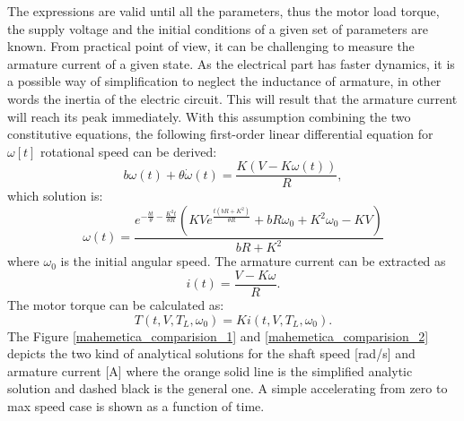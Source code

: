 \documentclass[12pt,english]{article}
\begin{document}
	 
The expressions are valid until all the parameters, thus the motor load torque, the supply voltage and the initial conditions of a given set of parameters are known. From practical point of view, it can be challenging to measure the armature current of a given state. As the electrical part has faster dynamics, it is a possible way of simplification to neglect the inductance of armature, in other words the inertia of the electric circuit. This will result that the armature current will reach its peak immediately.  With this assumption combining the two constitutive equations, the following first-order linear differential equation for $\omega[t]$ rotational speed can be derived:
\begin{equation}
	b \omega(t)+\theta \dot \omega(t)=\frac{K (V-K \omega(t))}{R},
\end{equation} 
which solution is:
\begin{equation}
	\omega(t) = \frac{e^{-\frac{b t}{\theta }-\frac{K^2 t}{\theta  R}} \left(K V e^{\frac{t \left(b R+K^2\right)}{\theta  R}}+b R \text{$\omega_0 $}+K^2 \text{$\omega_0 $}-K V\right)}{b R+K^2}
\end{equation}
where $\omega_0$ is the initial angular speed.
The armature current can be extracted as
\begin{equation}
	i(t) =\frac{V-K\omega}{R}.
\end{equation}
The motor torque can be calculated as:
\begin{equation}
T(t,V,T_L,\omega_0) = K i(t,V,T_L,\omega_0).
\end{equation}
The Figure \ref{mahemetica_comparision_1} and \ref{mahemetica_comparision_2} depicts the two kind of analytical solutions for the shaft speed [rad/s] and armature current [A] where the orange solid line is the simplified analytic solution and dashed black is the general one. A simple accelerating from zero to max speed case is shown as a function of time.
\end{document}
